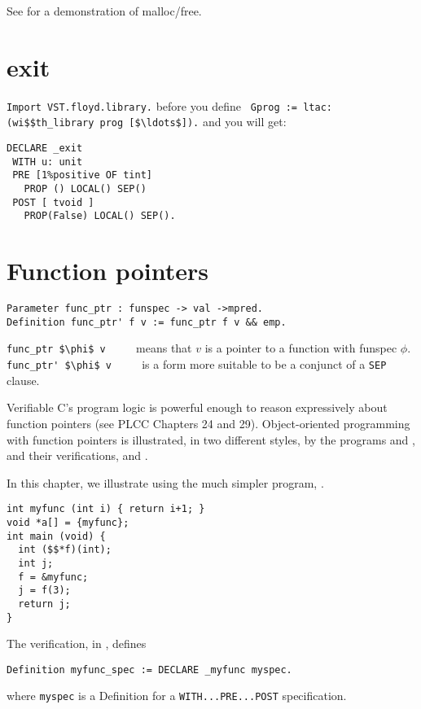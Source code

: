\documentclass[12pt,fleqn,openany,oneside,showtrims]{memoir}
\begin{document}
See  for a demonstration of malloc/free.

\chapter{exit}
\lstinline{Import VST.floyd.library.}
before you define\newline
\lstinline{ Gprog := ltac:(wi$$th_library prog [$\ldots$]).}
\newline and you will get:

\begin{lstlisting}
DECLARE _exit
 WITH u: unit
 PRE [1%positive OF tint]
   PROP () LOCAL() SEP()
 POST [ tvoid ]
   PROP(False) LOCAL() SEP().
\end{lstlisting}

\chapter{Function pointers}
\label{refcard:funcptr}
\begin{lstlisting}
Parameter func_ptr : funspec -> val ->mpred.
Definition func_ptr' f v := func_ptr f v && emp.
\end{lstlisting}
\lstinline{func_ptr $\phi$ v} $\qquad$ means that $v$
is a pointer to a function with funspec $\phi$.\newline
\lstinline{func_ptr' $\phi$ v} $\qquad$ is a form more suitable to
be a conjunct of a \lstinline{SEP} clause.

Verifiable C's program logic is powerful enough to reason expressively
about function pointers (see PLCC Chapters 24 and 29).  Object-oriented
programming with function pointers is illustrated, in two different
styles, by the programs  and ,
and their verifications,
 and .

In this chapter, we illustrate using the much simpler program,
.
\begin{lstlisting}
int myfunc (int i) { return i+1; }
void *a[] = {myfunc};
int main (void) {
  int ($$*f)(int);
  int j;
  f = &myfunc;
  j = f(3);
  return j;
}
\end{lstlisting}
The verification, in , defines
\begin{lstlisting}
Definition myfunc_spec := DECLARE _myfunc myspec.
\end{lstlisting}
where \lstinline{myspec} is
a Definition for a \lstinline{WITH...PRE...POST} specification.
\end{document}
